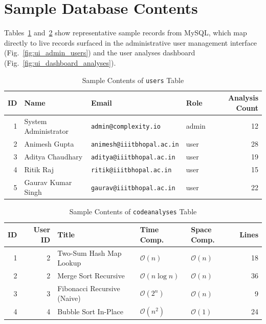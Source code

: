 \documentclass[12pt,a4paper]{report}
\DeclareRobustCommand{\_}{\textunderscore\allowbreak}
\begin{document}
\section{Sample Database Contents}
Tables~\ref{tab:users_sample} and~\ref{tab:analyses_sample} show representative sample records from MySQL, which map directly to live records surfaced in the administrative user management interface (Fig.~\ref{fig:ui_admin_users}) and the user analyses dashboard (Fig.~\ref{fig:ui_dashboard_analyses}).

\begin{table}[!htbp]
\centering
\small
\begin{tabular}{r >{\raggedright\arraybackslash}p{3.8cm} >{\raggedright\arraybackslash}p{4.6cm} p{1.5cm} r}
\toprule
\textbf{ID} & \textbf{Name} & \textbf{Email} & \textbf{Role} & \textbf{Analysis Count} \\
\midrule
1 & System Administrator & \texttt{admin@complexity.io} & admin & 12 \\
2 & Animesh Gupta & \texttt{animesh@iiitbhopal.ac.in} & user & 28 \\
3 & Aditya Chaudhary & \texttt{aditya@iiitbhopal.ac.in} & user & 19 \\
4 & Ritik Raj & \texttt{ritik@iiitbhopal.ac.in} & user & 15 \\
5 & Gaurav Kumar Singh & \texttt{gaurav@iiitbhopal.ac.in} & user & 22 \\
\bottomrule
\end{tabular}
\caption{Sample Contents of \texttt{users} Table}
\label{tab:users_sample}
\end{table}

\begin{table}[!htbp]
\centering
\small
\begin{tabular}{r r >{\raggedright\arraybackslash}p{3.5cm} p{2cm} p{2cm} r}
\toprule
\textbf{ID} & \textbf{User ID} & \textbf{Title} & \textbf{Time Comp.} & \textbf{Space Comp.} & \textbf{Lines} \\
\midrule
1 & 2 & Two-Sum Hash Map Lookup & $\mathcal{O}(n)$ & $\mathcal{O}(n)$ & 18 \\
2 & 2 & Merge Sort Recursive & $\mathcal{O}(n \log n)$ & $\mathcal{O}(n)$ & 36 \\
3 & 3 & Fibonacci Recursive (Naive) & $\mathcal{O}(2^n)$ & $\mathcal{O}(n)$ & 9 \\
4 & 4 & Bubble Sort In-Place & $\mathcal{O}(n^2)$ & $\mathcal{O}(1)$ & 24 \\
\bottomrule
\end{tabular}
\caption{Sample Contents of \texttt{code\_analyses} Table}
\label{tab:analyses_sample}
\end{table}
\end{document}
